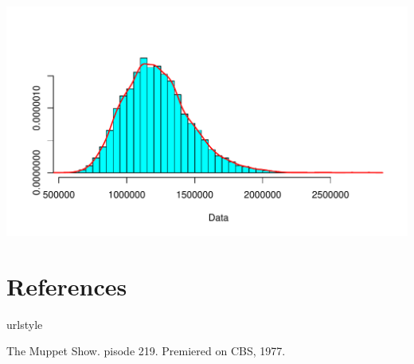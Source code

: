 \documentclass[letterpaper]{article}\usepackage[]{graphicx}\usepackage[]{color}
\makeatletter
\def\maxwidth{ %
  \ifdim\Gin@nat@width>\linewidth
    \linewidth
  \else
    \Gin@nat@width
  \fi
}
\newenvironment{knitrout}{}{} %
\makeatother
\begin{document}
\begin{knitrout}
\color{fgcolor}
\includegraphics[width=\maxwidth]{figure/Logplot} 

\end{knitrout}

\clearpage
\section{References}\label{Refs}
  

\begin{thebibliography}{1}
\providecommand{\natexlab}[1]{#1}
\providecommand{\url}[1]{\texttt{#1}}
\expandafter\ifx\csname urlstyle\endcsname\relax
  \providecommand{\doi}[1]{doi: #1}\else
  \providecommand{\doi}{doi: \begingroup \urlstyle{rm}\Url}\fi

{The Muppet Show}.
pisode 219.
\newblock Premiered on CBS, 1977.

\end{thebibliography}
\end{document}
